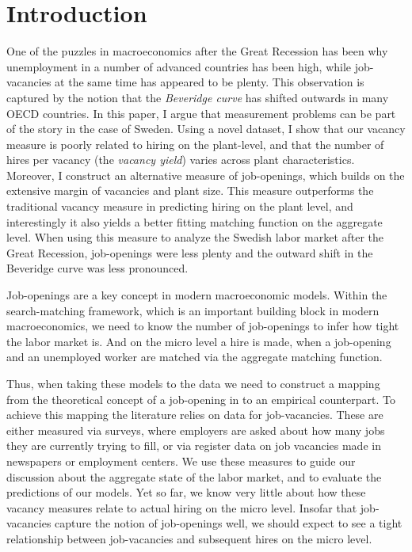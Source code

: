 \section{Introduction}

One of the puzzles in macroeconomics after the Great Recession has been why unemployment in a number of advanced countries has been high, while job-vacancies at the same time has appeared to be plenty. This observation is captured by the notion that the \emph{Beveridge curve} has shifted outwards in many OECD countries. In this paper, I argue that measurement problems can be part of the story in the case of Sweden. Using a novel dataset, I show that our vacancy measure is poorly related to hiring on the plant-level, and that the number of hires per vacancy (the \emph{vacancy yield}) varies across plant characteristics. Moreover, I construct an alternative measure of job-openings, which builds on the extensive margin of vacancies and plant size. This measure outperforms the traditional vacancy measure in predicting hiring on the plant level, and interestingly it also yields a better fitting matching function on the aggregate level. When using this measure to analyze the Swedish labor market after the Great Recession, job-openings were less plenty and the outward shift in the Beveridge curve was less pronounced. 

Job-openings are a key concept in modern macroeconomic models. Within the search-matching framework, which is an important building block in modern macroeconomics, we need to know the number of job-openings to infer how tight the labor market is. And on the micro level a hire is made, when a job-opening and an unemployed worker are matched via the aggregate matching function.

Thus, when taking these models to the data we need to construct a mapping from the theoretical concept of a job-opening in to an empirical counterpart. To achieve this mapping the literature relies on data for job-vacancies. These are either measured via surveys, where employers are asked about how many jobs they are currently trying to fill, or via register data on job vacancies made in newspapers or employment centers. We use these measures to guide our discussion about the aggregate state of the labor market, and to evaluate the predictions of our models. Yet so far, we know very little about how these vacancy measures relate to actual hiring on the micro level. Insofar that job-vacancies capture the notion of job-openings well, we should expect to see a tight relationship between job-vacancies and subsequent hires on the micro level. 

